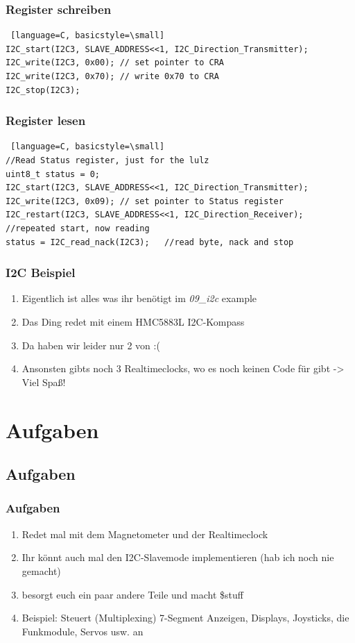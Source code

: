 \documentclass[ngerman,compress]{beamer}
\begin{document}
\begin{frame} [fragile]
	\frametitle{Register schreiben}
	\begin{lstlisting} [language=C, basicstyle=\small]
I2C_start(I2C3, SLAVE_ADDRESS<<1, I2C_Direction_Transmitter);
I2C_write(I2C3, 0x00); // set pointer to CRA
I2C_write(I2C3, 0x70); // write 0x70 to CRA
I2C_stop(I2C3);
	\end{lstlisting}
\end{frame}

\begin{frame} [fragile]
	\frametitle{Register lesen}
	\begin{lstlisting} [language=C, basicstyle=\small]
//Read Status register, just for the lulz
uint8_t status = 0;
I2C_start(I2C3, SLAVE_ADDRESS<<1, I2C_Direction_Transmitter);
I2C_write(I2C3, 0x09); // set pointer to Status register
I2C_restart(I2C3, SLAVE_ADDRESS<<1, I2C_Direction_Receiver);	//repeated start, now reading
status = I2C_read_nack(I2C3);	//read byte, nack and stop
	\end{lstlisting}
\end{frame}

\begin{frame}
	\frametitle{I2C Beispiel}
	\begin{enumerate}
		\item Eigentlich ist alles was ihr benötigt im \emph{09\_i2c} example
		\item Das Ding redet mit einem HMC5883L I2C-Kompass
		\item Da haben wir leider nur 2 von :(
		\item Ansonsten gibts noch 3 Realtimeclocks, wo es noch keinen Code für gibt -> Viel Spaß!
	\end{enumerate}
\end{frame}

\section{Aufgaben}
\subsection{Aufgaben}
\begin{frame}
	\frametitle{Aufgaben}
	\begin{enumerate}
		\item Redet mal mit dem Magnetometer und der Realtimeclock
		\item Ihr könnt auch mal den I2C-Slavemode implementieren (hab ich noch nie gemacht)
		\item besorgt euch ein paar andere Teile und macht \$stuff
		\item Beispiel: Steuert (Multiplexing) 7-Segment Anzeigen, Displays, Joysticks, die Funkmodule, Servos usw. an
	\end{enumerate}
\end{frame}
\end{document}
